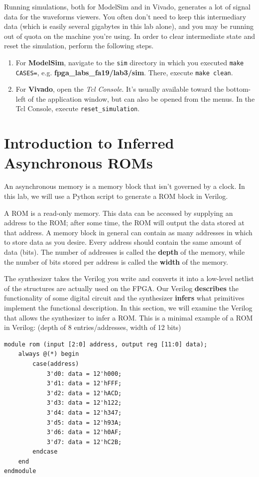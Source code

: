 \documentclass[11pt]{article}
\newcommand{\RepoRootPath}{fpga\_labs\_fa19}
\begin{document}
Running simulations, both for ModelSim and in Vivado, generates a lot of signal data for the waveforms viewers. You often don't need to keep this intermediary data (which is easily several gigabytes in this lab alone), and you may be running out of quota on the machine you're using. In order to clear intermediate state and reset the simulation, perform the following steps.

\begin{enumerate}
  \item For \textbf{ModelSim}, navigate to the \verb|sim| directory in which you executed \verb|make CASES=|, e.g. \textbf{\RepoRootPath/lab3/sim}. There, execute \verb|make clean|.
  \item For \textbf{Vivado}, open the \emph{Tcl Console}. It's usually available toward the bottom-left of the application window, but can also be opened from the menus. In the Tcl Console, execute \verb|reset_simulation|.
\end{enumerate}

\section{Introduction to Inferred Asynchronous ROMs}
An asynchronous memory is a memory block that isn't governed by a clock. In this lab, we will use a Python script to generate a ROM block in Verilog.

A ROM is a read-only memory. This data can be accessed by supplying an address to the ROM; after some time, the ROM will output the data stored at that address. A memory block in general can contain as many addresses in which to store data as you desire. Every address should contain the same amount of data (bits). The number of addresses is called the \textbf{depth} of the memory, while the number of bits stored per address is called the \textbf{width} of the memory.

The synthesizer takes the Verilog you write and converts it into a low-level netlist of the structures are actually used on the FPGA. Our Verilog \textbf{describes} the functionality of some digital circuit and the synthesizer \textbf{infers} what primitives implement the functional description. In this section, we will examine the Verilog that allows the synthesizer to infer a ROM. This is a minimal example of a ROM in Verilog: (depth of 8 entries/addresses, width of 12 bits)

\begin{verbatim}
module rom (input [2:0] address, output reg [11:0] data);
	always @(*) begin
		case(address)
			3'd0: data = 12'h000;
			3'd1: data = 12'hFFF;
			3'd2: data = 12'hACD;
			3'd3: data = 12'h122;
			3'd4: data = 12'h347;
			3'd5: data = 12'h93A;
			3'd6: data = 12'h0AF;
			3'd7: data = 12'hC2B;
		endcase
	end
endmodule
\end{verbatim}
\end{document}
